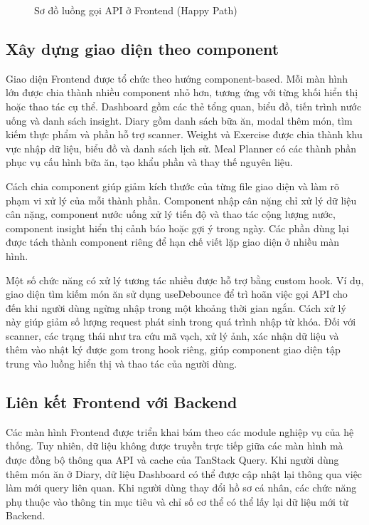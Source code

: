 \documentclass[12pt, a4paper]{report}
\begin{document}
\begin{figure}[htbp]
{
    }
    \caption{Sơ đồ luồng gọi API ở Frontend (Happy Path)}
    \label{fig:luong-goi-api-frontend}
\end{figure}

\subsection{Xây dựng giao diện theo component}Giao diện Frontend được tổ chức theo hướng component-based. Mỗi màn hình lớn được chia thành nhiều component nhỏ hơn, tương ứng với từng khối hiển thị hoặc thao tác cụ thể. Dashboard gồm các thẻ tổng quan, biểu đồ, tiến trình nước uống và danh sách insight. Diary gồm danh sách bữa ăn, modal thêm món, tìm kiếm thực phẩm và phần hỗ trợ scanner. Weight và Exercise được chia thành khu vực nhập dữ liệu, biểu đồ và danh sách lịch sử. Meal Planner có các thành phần phục vụ cấu hình bữa ăn, tạo khẩu phần và thay thế nguyên liệu.

Cách chia component giúp giảm kích thước của từng file giao diện và làm rõ phạm vi xử lý của mỗi thành phần. Component nhập cân nặng chỉ xử lý dữ liệu cân nặng, component nước uống xử lý tiến độ và thao tác cộng lượng nước, component insight hiển thị cảnh báo hoặc gợi ý trong ngày. Các phần dùng lại được tách thành component riêng để hạn chế viết lặp giao diện ở nhiều màn hình.

Một số chức năng có xử lý tương tác nhiều được hỗ trợ bằng custom hook. Ví dụ, giao diện tìm kiếm món ăn sử dụng useDebounce để trì hoãn việc gọi API cho đến khi người dùng ngừng nhập trong một khoảng thời gian ngắn. Cách xử lý này giúp giảm số lượng request phát sinh trong quá trình nhập từ khóa. Đối với scanner, các trạng thái như tra cứu mã vạch, xử lý ảnh, xác nhận dữ liệu và thêm vào nhật ký được gom trong hook riêng, giúp component giao diện tập trung vào luồng hiển thị và thao tác của người dùng.

\subsection{Liên kết Frontend với Backend}Các màn hình Frontend được triển khai bám theo các module nghiệp vụ của hệ thống. Tuy nhiên, dữ liệu không được truyền trực tiếp giữa các màn hình mà được đồng bộ thông qua API và cache của TanStack Query. Khi người dùng thêm món ăn ở Diary, dữ liệu Dashboard có thể được cập nhật lại thông qua việc làm mới query liên quan. Khi người dùng thay đổi hồ sơ cá nhân, các chức năng phụ thuộc vào thông tin mục tiêu và chỉ số cơ thể có thể lấy lại dữ liệu mới từ Backend.
\end{document}
